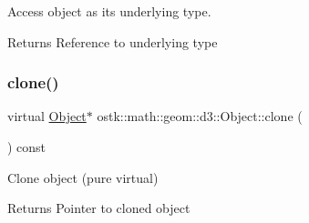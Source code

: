 Access object as its underlying type. 

\begin{DoxyReturn}{Returns}
Reference to underlying type 
\end{DoxyReturn}
\mbox{\label{classostk_1_1math_1_1geom_1_1d3_1_1_object_a676013f9555f6492687f9809b2db887b}} 
\subsubsection{\texorpdfstring{clone()}{clone()}}
{\footnotesize\ttfamily virtual \hyperlink{classostk_1_1math_1_1geom_1_1d3_1_1_object}{Object}$\ast$ ostk\+::math\+::geom\+::d3\+::\+Object\+::clone (\begin{DoxyParamCaption}{ }\end{DoxyParamCaption}) const\hspace{0.3cm}{\ttfamily [pure virtual]}}



Clone object (pure virtual) 

\begin{DoxyReturn}{Returns}
Pointer to cloned object 
\end{DoxyReturn}


